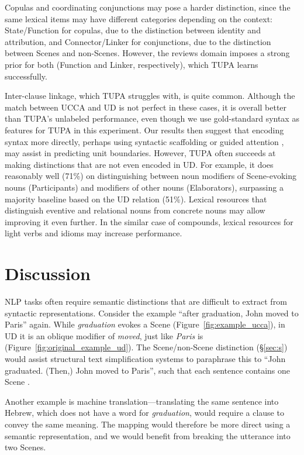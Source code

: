 \documentclass[11pt,a4paper,table]{article}
\begin{document}
Copulas and coordinating conjunctions may pose a harder distinction,
since the same lexical items may have different categories depending on the
context: State/Function for copulas,
due to the distinction between identity and attribution, and
Connector/Linker for conjunctions,
due to the distinction between Scenes and non-Scenes.
However, the reviews domain imposes a strong prior for both (Function and Linker,
respectively), which TUPA learns successfully.

Inter-clause linkage, which TUPA struggles with, is quite common.
Although the match between UCCA and UD is not perfect in these cases,
it is overall better than TUPA's unlabeled performance,
even though we use gold-standard syntax as features for TUPA in this experiment.
Our results then suggest that encoding syntax more directly, perhaps using syntactic
scaffolding \citep{swayamdipta2018syntactic}
or guided attention \citep{strubell2018linguistically},
may assist in predicting unit boundaries.
However, TUPA often succeeds at making distinctions that are not even encoded in UD.
For example, it does reasonably well (71\%) on distinguishing between noun modifiers of
Scene-evoking nouns (Participants) and modifiers of other nouns (Elaborators),
surpassing a majority baseline based on the UD relation (51\%).
Lexical resources that distinguish eventive and relational nouns from concrete 
nouns may allow improving it even further.
In the similar case of compounds, lexical resources for light verbs and idioms may increase performance.


\section{Discussion}\label{sec:discussion}

NLP tasks
often require semantic distinctions that are difficult to extract from syntactic representations.
Consider the example
``after graduation, John moved to Paris'' again.
While \textit{graduation} evokes a Scene
(Figure~\ref{fig:example_ucca}), in UD it is an oblique modifier of \textit{moved},
just like \textit{Paris} is (Figure~\ref{fig:original_example_ud}).
The Scene/non-Scene distinction (\S\ref{sec:s})
would assist structural text simplification systems
to paraphrase this to
``John graduated. (Then,) John moved to Paris'',
such that each sentence contains one Scene \cite{sulem2018samsa}.

Another example is machine translation---translating the same sentence into Hebrew,
which does not have a word for \textit{graduation},
would require a clause to convey the same meaning.
The mapping would therefore be more direct using a semantic representation,
and we would benefit from breaking the utterance into two Scenes.
\end{document}
